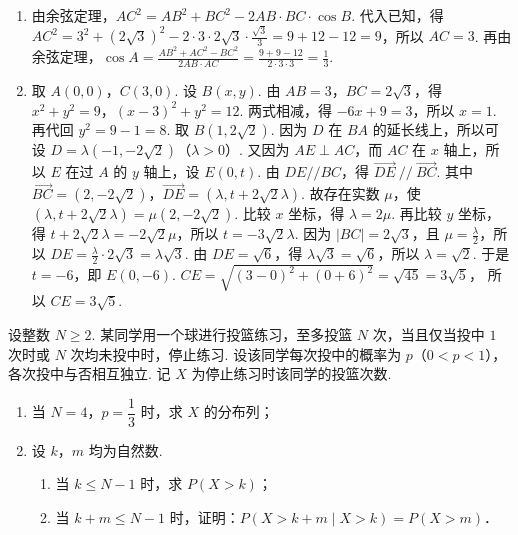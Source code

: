 \documentclass[UTF8,a4paper,oneside,11pt]{ctexbook}
\begin{document}
\begin{solution}
\begin{enumerate}
\item 由余弦定理，\(AC^2=AB^2+BC^2-2AB\cdot BC\cdot \cos B\). 代入已知，得 \(AC^2=3^2+\left( 2\sqrt{3} \right)^2-2\cdot 3\cdot 2\sqrt{3}\cdot \frac{\sqrt{3}}{3}=9+12-12=9\)，所以 \(AC=3\). 再由余弦定理，\(\cos A=\frac{AB^2+AC^2-BC^2}{2AB\cdot AC}=\frac{9+9-12}{2\cdot 3\cdot 3}=\frac{1}{3}\).

\item 取 \(A(0,0)\)，\(C(3,0)\). 设 \(B(x,y)\). 由 \(AB=3\)，\(BC=2\sqrt{3}\)，得 \(x^2+y^2=9\)，\(\left( x-3 \right)^2+y^2=12\). 两式相减，得 \(-6x+9=3\)，所以 \(x=1\). 再代回 \(y^2=9-1=8\). 取 \(B\left( 1,2\sqrt{2} \right)\).
因为 \(D\) 在 \(BA\) 的延长线上，所以可设 \(D=\lambda \left( -1,-2\sqrt{2} \right)\)（\(\lambda>0\)）. 又因为 \(AE\perp AC\)，而 \(AC\) 在 \(x\) 轴上，所以 \(E\) 在过 \(A\) 的 \(y\) 轴上，设 \(E(0,t)\).
由 \(DE // BC\)，得 \(\overrightarrow{DE}\ //\ \overrightarrow{BC}\). 其中 \(\overrightarrow{BC}=\left( 2,-2\sqrt{2} \right)\)，\(\overrightarrow{DE}=\left( \lambda,t+2\sqrt{2}\lambda \right)\). 故存在实数 \(\mu\)，使 \(\left( \lambda,t+2\sqrt{2}\lambda \right)=\mu \left( 2,-2\sqrt{2} \right)\). 比较 \(x\) 坐标，得 \(\lambda=2\mu\). 再比较 \(y\) 坐标，得 \(t+2\sqrt{2}\lambda=-2\sqrt{2}\mu\)，所以 \(t=-3\sqrt{2}\lambda\).
因为 \(\lvert BC\rvert =2\sqrt{3}\)，且 \(\mu=\frac{\lambda}{2}\)，所以 \(DE=\frac{\lambda}{2}\cdot 2\sqrt{3}=\lambda \sqrt{3}\). 由 \(DE=\sqrt{6}\)，得 \(\lambda \sqrt{3}=\sqrt{6}\)，所以 \(\lambda=\sqrt{2}\). 于是 \(t=-6\)，即 \(E(0,-6)\).
\(CE=\sqrt{\left( 3-0 \right)^2+\left( 0+6 \right)^2}=\sqrt{45}=3\sqrt{5}\)，
所以 \(CE=3\sqrt{5}\).
\end{enumerate}
\end{solution}

\begin{problem}
设整数 \(N\ge 2\). 某同学用一个球进行投篮练习，至多投篮 \(N\) 次，当且仅当投中 \(1\) 次时或 \(N\) 次均未投中时，停止练习. 设该同学每次投中的概率为 \(p\)（\(0<p<1\)），各次投中与否相互独立. 记 \(X\) 为停止练习时该同学的投篮次数.

\begin{enumerate}
\item 当 \(N=4\)，\(p=\dfrac{1}{3}\) 时，求 \(X\) 的分布列；
\item 设 \(k\)，\(m\) 均为自然数.
\begin{enumerate}
\item 当 \(k\le N-1\) 时，求 \(P(X>k)\)；
\item 当 \(k+m\le N-1\) 时，证明：\(P(X>k+m\mid X>k)=P(X>m)\)．
\end{enumerate}
\end{enumerate}
\end{problem}
\end{document}
